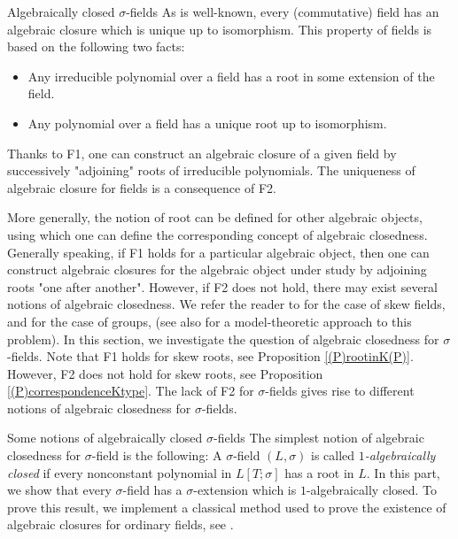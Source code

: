 \documentclass[11pt,a4paper]{article}
\theoremstyle{theorem}
\numberwithin{equation}{section}
\newcommand{\s}{\sigma}
\begin{document}
\begin{section}{Algebraically closed $\s$-fields}	
	As is well-known, every (commutative) field has an algebraic closure which is unique up to isomorphism. This property of  fields is based on the following two facts: 
	\begin{itemize}
		\item[F1]  Any irreducible polynomial over a field has a root in some extension of the field.
		\item[F2] Any  polynomial over a field has a unique root up to isomorphism.
	\end{itemize}
	Thanks to F1, one can construct an algebraic closure of a given field by successively "adjoining" roots of irreducible polynomials.   The uniqueness of algebraic closure for fields is a consequence of F2.    
	
	More generally, the notion of root can be defined for other algebraic objects, using which one can define the corresponding concept of algebraic closedness. Generally speaking, if F1 holds for a particular algebraic object, then one can construct algebraic closures for the algebraic object under study by adjoining roots "one after another". However, if F2 does not hold, there may exist several notions of algebraic closedness.  We refer the reader to  \cite{cohn1975presentations,niven1941equations} for the case of skew fields, and \cite{neumann1943adjunction, scott1951algebraically} for the case of groups, (see also  \cite{robinson1971notion} for a model-theoretic approach to this problem).   In this section, we  investigate  the question of algebraic closedness for $\s$-fields. Note that F1 holds for skew roots, see Proposition \ref{(P)rootinK(P)}. However, F2 does not hold for skew roots, see  Proposition \ref{(P)correspondenceKtype}. The lack of F2 for $\s$-fields gives rise to different notions of algebraic closedness for $\s$-fields.  

	

	\begin{subsection}{Some notions of algebraically closed $\s$-fields} 
		The simplest notion of algebraic closedness for $\sigma$-field is the following: A $\s$-field $(L,\sigma)$ is called \textit{$1$-algebraically closed} if every  nonconstant  polynomial in $L[T;\s]$ has a root in $L$. In this part, we show that every $\s$-field has  a $\s$-extension which is $1$-algebraically closed. To prove this result, we implement a classical method used to prove the existence of algebraic closures for ordinary fields, see \cite[Theorem 2.5]{lang2012algebra}. 
		

\end{subsection}
\end{section}
\end{document}
